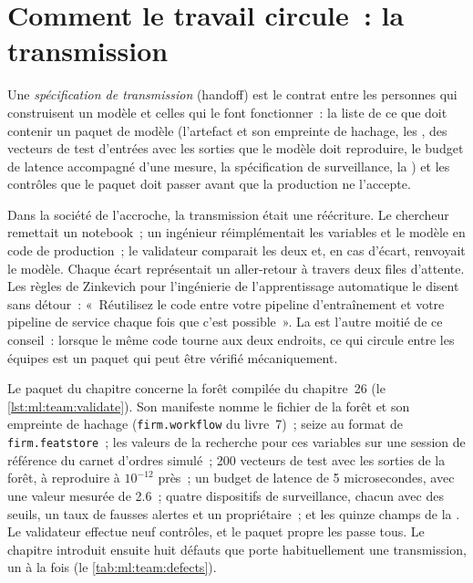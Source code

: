 \section{Comment le travail circule~: la transmission}

\begin{definition}\label{def:ml:the-machine-learning-team:handoff}
Une \emph{spécification de transmission} (handoff) est le contrat entre les personnes qui construisent un modèle et celles qui le font
fonctionner~: la liste de ce que doit contenir un paquet de modèle (l'artefact et son empreinte de hachage, les , des vecteurs de test
d'entrées avec les sorties que le modèle doit reproduire, le budget de latence accompagné d'une mesure, la spécification de surveillance,
la ) et les contrôles que le paquet doit passer avant que la production ne l'accepte.
\end{definition}

Dans la société de l'accroche, la transmission était une réécriture. Le chercheur remettait un notebook~; un ingénieur réimplémentait les variables et le modèle
en code de production~; le validateur comparait les deux et, en cas d'écart, renvoyait le modèle. Chaque écart représentait un aller-retour à travers deux files d'attente. Les règles de Zinkevich pour l'ingénierie de l'apprentissage
automatique le disent sans détour~: «~Réutilisez le code entre votre pipeline d'entraînement et votre pipeline de service chaque fois que c'est possible~». La  est l'autre moitié de ce conseil~: lorsque le même code
tourne aux deux endroits, ce qui circule entre les équipes est
un paquet qui peut être vérifié mécaniquement.

Le paquet du chapitre concerne la forêt compilée du chapitre~26 (le \cref{lst:ml:team:validate}). Son manifeste nomme le fichier de la forêt et
son empreinte de hachage (\texttt{firm.workflow} du livre~7)~; seize  au format de \texttt{firm.featstore}~; les valeurs de la recherche pour ces variables sur une session de référence
du carnet d'ordres simulé~; 200 vecteurs de test avec les sorties de la forêt, à reproduire à $10^{-12}$ près~; un budget de latence de 5 microsecondes, avec une valeur mesurée de 2.6~;
quatre dispositifs de surveillance, chacun avec des seuils, un taux de fausses alertes et un propriétaire~; et les quinze champs de la .
Le validateur effectue neuf contrôles, et le paquet propre les passe tous. Le chapitre introduit ensuite huit défauts que porte habituellement une transmission,
un à la fois (le \cref{tab:ml:team:defects}).

